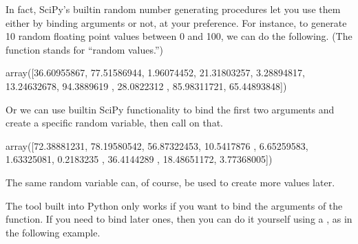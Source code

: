 \documentclass[letterpaper,10pt,english]{jupyterBook}
\begin{document}
\sphinxAtStartPar
In fact, SciPy’s built\sphinxhyphen{}in random number generating procedures let you use them either by binding arguments or not, at your preference.  For instance, to generate 10 random floating point values between 0 and 100, we can do the following.  (The  function stands for “random values.”)

\begin{sphinxVerbatim}[commandchars=\\\{\}]
   
    
\end{sphinxVerbatim}

\begin{sphinxVerbatim}[commandchars=\\\{\}]
array([36.60955867, 77.51586944,  1.96074452, 21.31803257,  3.28894817,
       13.24632678, 94.3889619 , 28.0822312 , 85.98311721, 65.44893848])
\end{sphinxVerbatim}

\sphinxAtStartPar
Or we can use built\sphinxhyphen{}in SciPy functionality to bind the first two arguments and create a specific random variable, then call  on that.

\begin{sphinxVerbatim}[commandchars=\\\{\}]
       
               
\end{sphinxVerbatim}

\begin{sphinxVerbatim}[commandchars=\\\{\}]
array([72.38881231, 78.19580542, 56.87322453, 10.5417876 ,  6.65259583,
        1.63325081,  0.2183235 , 36.4144289 , 18.48651172,  3.77368005])
\end{sphinxVerbatim}

\sphinxAtStartPar
The same random variable can, of course, be used to create more values later.

\sphinxAtStartPar
The  tool built into Python only works if you want to bind the  arguments of the function.  If you need to bind later ones, then you can do it yourself using a , as in the following example.
\end{document}
